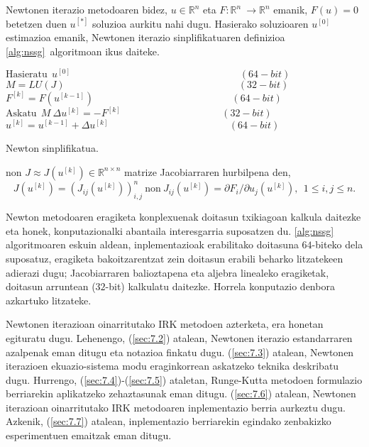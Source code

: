 Newtonen iterazio metodoaren bidez, $u\in \mathbb{R}^{n}$ eta $F: \mathbb{R}^n \ \longrightarrow {\mathbb{R}}^n$ emanik, $F(u)=0$ betetzen duen $u^{[*]}$ soluzioa aurkitu nahi dugu. Hasierako soluzioaren $u^{[0]}$ estimazioa  emanik,  Newtonen iterazio sinplifikatuaren definizioa \ref{alg:nssg}~algoritmoan ikus daiteke.

\begin{algorithm}[H]
  \BlankLine
  $ \text{Hasieratu} \ \ u^{[0]}   \quad \quad \quad \quad \quad \quad \quad \quad\quad \quad \quad \quad \quad \quad \quad \quad \quad    (64-bit)$\;
  $M=LU(J) \ \ \quad \quad \quad \quad \quad \quad \quad \quad\quad \quad \quad \quad \quad \quad \quad \quad \quad    (32-bit)$\;
  {
   \BlankLine
   $F^{[k]}=F(u^{[k-1]}) \  \quad \ \quad \quad \quad \quad \quad \quad \quad \quad \quad \quad \quad \quad \ \   (64-bit)$\;
   $\text{Askatu} \ \ M \ \Delta u^{[k]}=- F^{[k]} \ \quad \ \quad \quad \quad \quad \quad \quad \quad \quad \ \ \  (32-bit)$\;
   \BlankLine
   $u^{[k]}=u^{[k-1]}+\Delta u^{[k]}  \ \ \ \quad \quad \quad \quad\quad \quad \quad \quad \quad \quad \quad \ \     (64-bit)$\;
  }
 \caption{Newton sinplifikatua.}
 \label{alg:nssg}
\end{algorithm}
%
non $J \approx J(u^{[k]}) \in \mathbb{R}^{n \times n}$ matrize Jacobiarraren hurbilpena den,
\begin{equation*}
J(u^{[k]})=(J_{ij}(u^{[k]}))_{i,j}^n \ \text{non} \ J_{ij}(u^{[k]})=\partial F_i/\partial u_j (u^{[k]}), \ \ 1 \leq i,j \leq n. 
\end{equation*} 


Newton metodoaren eragiketa konplexuenak doitasun txikiagoan kalkula daitezke \cite{Baboulin20092526} eta honek, konputazionalki abantaila interesgarria suposatzen du. \ref{alg:nssg} algoritmoaren  eskuin aldean, inplementazioak erabilitako doitasuna $64$-biteko dela suposatuz, eragiketa bakoitzarentzat zein doitasun erabili beharko litzatekeen adierazi dugu; Jacobiarraren balioztapena eta aljebra linealeko eragiketak, doitasun arruntean ($32$-bit) kalkulatu daitezke. Horrela konputazio denbora azkartuko litzateke.

Newtonen iterazioan oinarritutako IRK metodoen azterketa, era honetan egituratu dugu. Lehenengo, (\ref{sec:7.2}) atalean, Newtonen iterazio estandarraren azalpenak eman ditugu eta notazioa finkatu dugu. (\ref{sec:7.3}) atalean, Newtonen iterazioen ekuazio-sistema modu eraginkorrean askatzeko teknika deskribatu dugu. Hurrengo, (\ref{sec:7.4})-(\ref{sec:7.5}) ataletan, Runge-Kutta metodoen formulazio berriarekin aplikatzeko zehaztasunak eman ditugu. (\ref{sec:7.6}) atalean, Newtonen iterazioan oinarritutako IRK metodoaren inplementazio berria aurkeztu dugu. Azkenik, (\ref{sec:7.7}) atalean, inplementazio berriarekin egindako zenbakizko esperimentuen emaitzak eman ditugu. 

